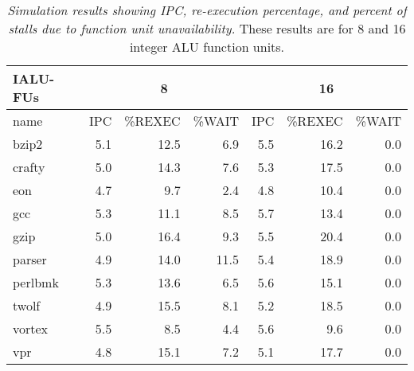\documentclass[10pt,dvips]{article}
\begin{document}
%
\begin{table}[p]
\begin{center}
\caption{{\em Simulation results showing IPC, re-execution percentage,
and percent of stalls due to function unit unavailability.}
These results are for 8 and 16 integer ALU function units.}
\label{tab:iwsize16b}
\vspace{+0.1in}
\begin{tabular}{|l||r|r|r||r|r|r|}
\hline 
{IALU-FUs}& 
\multicolumn{3}{c||}{8} &
\multicolumn{3}{c|}{16} \\
\hline
name &
IPC & \%REXEC & \%WAIT &
IPC & \%REXEC & \%WAIT \\


\hline
bzip2&
5.1 & 12.5 &6.9 & 5.5 & 16.2 & 0.0 \\

\hline
crafty&
5.0 & 14.3 & 7.6 & 5.3 & 17.5 & 0.0 \\

\hline
eon&
4.7 & 9.7 & 2.4 & 4.8 & 10.4 & 0.0 \\

\hline
gcc&
5.3 & 11.1 & 8.5 & 5.7 & 13.4 & 0.0 \\

\hline
gzip&
5.0 & 16.4 & 9.3 & 5.5 & 20.4 & 0.0 \\

\hline
parser&
4.9 & 14.0 & 11.5 & 5.4 & 18.9 & 0.0 \\

\hline
perlbmk&
5.3 & 13.6 & 6.5 & 5.6 & 15.1 & 0.0 \\

\hline
twolf&
4.9 & 15.5 & 8.1 & 5.2 & 18.5 & 0.0 \\

\hline
vortex&
5.5 & 8.5 & 4.4 & 5.6 & 9.6 & 0.0 \\

\hline
vpr&
4.8 & 15.1 & 7.2 & 5.1 & 17.7 & 0.0 \\


\hline
\end{tabular}
\end{center}
\end{table}
%





%


%
\end{document}
